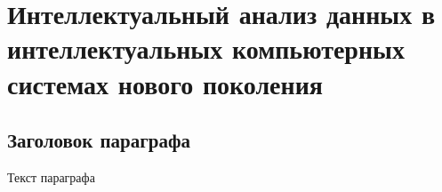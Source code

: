
\chapter{Интеллектуальный анализ данных в интеллектуальных компьютерных системах нового поколения}
\label{chapter_data_mining}


\section{Заголовок параграфа}
Текст параграфа

%